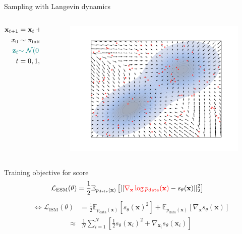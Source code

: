 \documentclass[handout, aspectratio=169,xcolor=dvipsnames]{beamer}
\newcommand{\bx}{\mathbf{x}}
\newcommand{\nbx}{\nabla_{\bx}}
\begin{document}
\begin{frame}{Sampling with Langevin dynamics}
  \begin{columns}
    \begin{column}{0.5\textwidth}
      \begin{align*}
        \bx_{t+1} &= \bx_{t} + \alpha \cdot s_\theta(\bx_t) + \textcolor{teal}{\alpha \epsilon \cdot \mathbf{z}_t} \\
        x_0 &\sim \pi_{\text{init}}\\
        \textcolor{teal}{\textbf{z}_t} &\textcolor{teal}{\sim \mathcal{N}(0, 1)}\\
        t &= 0, 1, \dots T \to \infty
      \end{align*}
    \end{column}
    \begin{column}{0.5\textwidth}
      \centering
      \begin{figure}
        \centering
        \includegraphics[width=\textwidth]{figs/gen/gaussian_mixture_score_init.png}
      \end{figure}
    \end{column}
  \end{columns}
\end{frame}

\begin{frame}{Training objective for score}
  \pause
\begin{align*}
      \mathcal{L}_\text{ESM} (\theta) &= \frac{1}{2}\mathbb{E}_{p_\text{data}(\bx)} \left[ || \textcolor{red}{\nbx \log p_\text{data}(\bx)} - s_\theta(\bx) ||_2^2\right]
  \end{align*}
  \pause
  \begin{align*}
      \iff \mathcal{L}_\text{ISM}(\theta) &= \frac{1}{2}\mathbb{E}_{p_\text{data}(\bx)} \left[ s_\theta(\bx)^2\right] + \mathbb{E}_{p_\text{data}(\bx)}\left[\nbx s_\theta(\bx) \right]
  \end{align*}
  \pause
  \begin{align*}
      \approx & \frac{1}{N} \sum\limits_{i=1}^{N}  \left[\frac{1}{2} s_\theta(\bx_i)^2 + \nabla_{\bx_i} s_\theta(\bx_i)  \right]
  \end{align*}
\end{frame}
\end{document}
